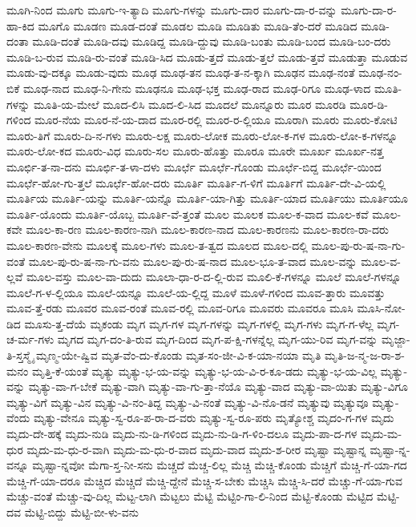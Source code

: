 {ಮೂಗಿ-ನಿಂದ
ಮೂಗು
ಮೂಗು-ಇ-ತ್ಯಾದಿ
ಮೂಗು-ಗಳನ್ನು
ಮೂಗು-ದಾರ
ಮೂಗು-ದಾ-ರ-ವನ್ನು
ಮೂಗು-ದಾ-ರ-ಹಾ-ಕಿದ
ಮೂಗೊ
ಮೂಡಣ
ಮೂಡ-ದಂತೆ
ಮೂಡಲ
ಮೂಡಿ
ಮೂಡಿತು
ಮೂಡಿ-ತೆಂ-ದರೆ
ಮೂಡಿದ
ಮೂಡಿ-ದಂತಾ
ಮೂಡಿ-ದಂತೆ
ಮೂಡಿ-ದವು
ಮೂಡಿದ್ದ
ಮೂಡಿ-ದ್ದುವು
ಮೂಡಿ-ಬಂತು
ಮೂಡಿ-ಬಂದ
ಮೂಡಿ-ಬಂ-ದರು
ಮೂಡಿ-ಬ-ರುವ
ಮೂಡಿ-ರು-ವಂತೆ
ಮೂಡಿ-ಸಿದ
ಮೂಡು-ತ್ತದೆ
ಮೂಡು-ತ್ತಲೆ
ಮೂಡು-ತ್ತವೆ
ಮೂಡುತ್ತಾ
ಮೂಡುವ
ಮೂಡು-ವು-ದಕ್ಕೂ
ಮೂಡು-ವುದು
ಮೂಢ
ಮೂಢ-ತನ
ಮೂಢ-ತ-ನ-ಕ್ಕಾಗಿ
ಮೂಢನ
ಮೂಢ-ನಂತೆ
ಮೂಢ-ನಂ-ಬಿಕೆ
ಮೂಢ-ನಾದ
ಮೂಢ-ನಿ-ಗೇನು
ಮೂಢನೂ
ಮೂಢ-ಭಕ್ತ
ಮೂಢ-ರಾದ
ಮೂಢ-ರಿಗೂ
ಮೂಢ-ಳಾದ
ಮೂತಿ-ಗಳನ್ನು
ಮೂತಿ-ಯ-ಮೇಲೆ
ಮೂದ-ಲಿಸಿ
ಮೂದ-ಲಿ-ಸಿದ
ಮೂದಲೆ
ಮೂನ್ನೂರು
ಮೂರ
ಮೂರಡಿ
ಮೂರ-ಡಿ-ಗಳಿಂದ
ಮೂರ-ನೆಯ
ಮೂರ-ನೆ-ಯ-ದಾದ
ಮೂರ-ರಲ್ಲಿ
ಮೂರ-ರ-ಲ್ಲಿಯೂ
ಮೂರಾಗಿ
ಮೂರು
ಮೂರು-ಕೋಟಿ
ಮೂರು-ತಿಗೆ
ಮೂರು-ದಿ-ನ-ಗಳು
ಮೂರು-ಲಕ್ಷ
ಮೂರು-ಲೋಕ
ಮೂರು-ಲೋ-ಕ-ಗಳ
ಮೂರು-ಲೋ-ಕ-ಗಳನ್ನೂ
ಮೂರು-ಲೋ-ಕದ
ಮೂರು-ವಿಧ
ಮೂರು-ಸಲ
ಮೂರು-ಹೊತ್ತು
ಮೂರೂ
ಮೂರೇ
ಮೂರ್ಖ
ಮೂರ್ಖ-ನತ್ತ
ಮೂರ್ಛಿ-ತ-ನಾ-ದನು
ಮೂರ್ಛಿ-ತ-ಳಾ-ದಳು
ಮೂರ್ಛೆ
ಮೂರ್ಛೆ-ಗೊಂಡು
ಮೂರ್ಛೆ-ಬಿದ್ದ
ಮೂರ್ಛೆ-ಯಿಂದ
ಮೂರ್ಛೆ-ಹೋ-ಗು-ತ್ತಲೆ
ಮೂರ್ಛೆ-ಹೋ-ದರು
ಮೂರ್ತಿ
ಮೂರ್ತಿ-ಗ-ಳಿಗೆ
ಮೂರ್ತಿಗೆ
ಮೂರ್ತಿ-ದೇ-ವಿ-ಯಲ್ಲಿ
ಮೂರ್ತಿಯ
ಮೂರ್ತಿ-ಯನ್ನು
ಮೂರ್ತಿ-ಯನ್ನೊ
ಮೂರ್ತಿ-ಯಾ-ಗಿತ್ತು
ಮೂರ್ತಿ-ಯಾದ
ಮೂರ್ತಿಯು
ಮೂರ್ತಿಯೂ
ಮೂರ್ತಿ-ಯೊಂದು
ಮೂರ್ತಿ-ಯೊಬ್ಬ
ಮೂರ್ತಿ-ವೆ-ತ್ತಂತೆ
ಮೂಲ
ಮೂಲಕ
ಮೂಲ-ಕ-ವಾದ
ಮೂಲ-ಕವೆ
ಮೂಲ-ಕವೇ
ಮೂಲ-ಕಾ-ರಣ
ಮೂಲ-ಕಾರಣ-ನಾಗಿ
ಮೂಲ-ಕಾರಣ-ನಾದ
ಮೂಲ-ಕಾರಣನು
ಮೂಲ-ಕಾರಣ-ರಾ-ದರು
ಮೂಲ-ಕಾರಣ-ವೇನು
ಮೂಲಕ್ಕೆ
ಮೂಲ-ಗಳು
ಮೂಲ-ತ-ತ್ವದ
ಮೂಲದ
ಮೂಲ-ದಲ್ಲಿ
ಮೂಲ-ಪು-ರು-ಷ-ನಾ-ಗು-ವಂತೆ
ಮೂಲ-ಪು-ರು-ಷ-ನಾ-ಗು-ವನು
ಮೂಲ-ಪು-ರು-ಷ-ನಾದ
ಮೂಲ-ಭೂ-ತ-ವಾದ
ಮೂಲ-ವನ್ನು
ಮೂಲ-ವ-ಲ್ಲವೆ
ಮೂಲ-ವಸ್ತು
ಮೂಲ-ವಾ-ದುದು
ಮೂಲಾ-ಧಾ-ರ-ದ-ಲ್ಲಿ-ರುವ
ಮೂಲಿ-ಕೆ-ಗಳನ್ನೂ
ಮೂಲೆ
ಮೂಲೆ-ಗಳನ್ನೂ
ಮೂಲೆ-ಗ-ಳ-ಲ್ಲಿಯೂ
ಮೂಲೆ-ಯನ್ನೂ
ಮೂಲೆ-ಯ-ಲ್ಲಿದ್ದ
ಮೂಳೆ
ಮೂಳೆ-ಗಳಿಂದ
ಮೂವ-ತ್ತಾರು
ಮೂವತ್ತು
ಮೂವ-ತ್ತೆ-ರಡು
ಮೂವರ
ಮೂವ-ರಂತೆ
ಮೂವ-ರಲ್ಲಿ
ಮೂವ-ರಿಗೂ
ಮೂವರು
ಮೂವರೂ
ಮೂಸಿ
ಮೂಸಿ-ನೋ-ಡಿದ
ಮೂಸು-ತ್ತ-ದೆಯೆ
ಮೃಕಂಡು
ಮೃಗ
ಮೃಗ-ಗಳ
ಮೃಗ-ಗಳನ್ನು
ಮೃಗ-ಗಳಲ್ಲಿ
ಮೃಗ-ಗಳು
ಮೃಗ-ಗ-ಳೆಲ್ಲ
ಮೃಗ-ಚ-ರ್ಮ-ಗಳು
ಮೃಗದ
ಮೃಗ-ದಂ-ತಿ-ರುವ
ಮೃಗ-ದಿಂದ
ಮೃಗ-ಪ-ಕ್ಷಿ-ಗಳನ್ನೆಲ್ಲ
ಮೃಗ-ಯು-ರಿವ
ಮೃಗ-ವನ್ನು
ಮೃಜ್ಜಾ-ತಿ-ಸ್ತಸ್ಮೈ
ಮೃಣ್ಮ-ಯೇ-ಷ್ವಿವ
ಮೃತ-ವೆಂ-ದು-ಕೊಂಡು
ಮೃತ-ಸಂ-ಜೀ-ವಿ-ಕ-ಯಾ-ನಯಾ
ಮೃತಿ
ಮೃತಿ-ಜ-ನ್ಮ-ಜ-ರಾ-ಶ-ಮನಂ
ಮೃತ್ತಿ-ಕೆ-ಯಂತೆ
ಮೃತ್ಯು
ಮೃತ್ಯು-ಭ-ಯ-ವನ್ನು
ಮೃತ್ಯು-ಭ-ಯ-ವಿ-ರ-ಕೂ-ಡದು
ಮೃತ್ಯು-ಭ-ಯ-ವಿಲ್ಲ
ಮೃತ್ಯು-ವನ್ನು
ಮೃತ್ಯು-ವಾ-ಗ-ಬೇಕೆ
ಮೃತ್ಯು-ವಾಗಿ
ಮೃತ್ಯು-ವಾ-ಗು-ತ್ತಾ-ನೆಯೊ
ಮೃತ್ಯು-ವಾದ
ಮೃತ್ಯು-ವಾ-ಯಿತು
ಮೃತ್ಯು-ವಿಗೂ
ಮೃತ್ಯು-ವಿಗೆ
ಮೃತ್ಯು-ವಿನ
ಮೃತ್ಯು-ವಿ-ನಂ-ತಿದ್ದ
ಮೃತ್ಯು-ವಿ-ನಂತೆ
ಮೃತ್ಯು-ವಿ-ನೊ-ಡನೆ
ಮೃತ್ಯುವು
ಮೃತ್ಯುವೂ
ಮೃತ್ಯು-ವೆಂದು
ಮೃತ್ಯು-ವೇನೂ
ಮೃತ್ಯು-ಸ್ವ-ರೂ-ಪ-ರಾ-ದ-ವರು
ಮೃತ್ಯು-ಸ್ವ-ರೂ-ಪರು
ಮೃತ್ಯೋಶ್ಚ
ಮೃದಂ-ಗ-ಗಳ
ಮೃದು
ಮೃದು-ದೇ-ಹಕ್ಕೆ
ಮೃದು-ನುಡಿ
ಮೃದು-ನು-ಡಿ-ಗಳಿಂದ
ಮೃದು-ನು-ಡಿ-ಗ-ಳಿಂ-ದಲೂ
ಮೃದು-ಪಾ-ದ-ಗಳ
ಮೃದು-ಮ-ಧುರ
ಮೃದು-ಮ-ಧು-ರ-ವಾಗಿ
ಮೃದು-ಮ-ಧು-ರ-ವಾದ
ಮೃದು-ವಾದ
ಮೃದು-ಶ-ರೀರ
ಮೃಷ್ಟಾ
ಮೃಷ್ಟಾನ್ನ
ಮೃಷ್ಟಾ-ನ್ನ-ವನ್ನೂ
ಮೃಷ್ಟಾ-ನ್ನವೋ
ಮೆಗಾ-ಸ್ತ-ನೀ-ಸನು
ಮೆಚ್ಚದೆ
ಮೆಚ್ಚ-ಲಿಲ್ಲ
ಮೆಚ್ಚಿ
ಮೆಚ್ಚಿ-ಕೊಂಡು
ಮೆಚ್ಚಿಗೆ
ಮೆಚ್ಚಿ-ಗೆ-ಯಾ-ಗದ
ಮೆಚ್ಚಿ-ಗೆ-ಯಾ-ದರೂ
ಮೆಚ್ಚಿದ
ಮೆಚ್ಚಿದೆ
ಮೆಚ್ಚಿ-ದ್ದೇನೆ
ಮೆಚ್ಚಿ-ಸ-ಬೇಕು
ಮೆಚ್ಚಿಸಿ
ಮೆಚ್ಚಿ-ಸಿ-ದರೆ
ಮೆಚ್ಚು-ಗೆ-ಯಾ-ಗುವ
ಮೆಚ್ಚು-ವಂತೆ
ಮೆಚ್ಚು-ವು-ದಿಲ್ಲ
ಮೆಟ್ಟ-ಲಾಗಿ
ಮೆಟ್ಟಲು
ಮೆಟ್ಟಿ
ಮೆಟ್ಟಿಂ-ಗಾ-ಲಿ-ನಿಂದ
ಮೆಟ್ಟಿ-ಕೊಂಡು
ಮೆಟ್ಟಿದ
ಮೆಟ್ಟಿ-ದವ
ಮೆಟ್ಟಿ-ಬಿದ್ದು
ಮೆಟ್ಟಿ-ಬೀ-ಳು-ವನು
}
